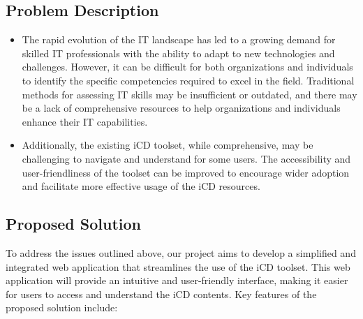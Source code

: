 \subsection{Problem Description}
\begin{itemize}
    \renewcommand\labelitemi{-}
    \item The rapid evolution of the IT landscape has led to a growing demand for skilled IT professionals with the ability to adapt to new technologies and challenges. However, it can be difficult for both organizations and individuals to identify the specific competencies required to excel in the field. Traditional methods for assessing IT skills may be insufficient or outdated, and there may be a lack of comprehensive resources to help organizations and individuals enhance their IT capabilities.
          
    \item Additionally, the existing iCD toolset, while comprehensive, may be challenging to navigate and understand for some users. The accessibility and user-friendliness of the toolset can be improved to encourage wider adoption and facilitate more effective usage of the iCD resources.
\end{itemize}



\subsection{Proposed Solution}
To address the issues outlined above, our project aims to develop a simplified and integrated web application that streamlines the use of the iCD toolset. This web application will provide an intuitive and user-friendly interface, making it easier for users to access and understand the iCD contents. Key features of the proposed solution include:

